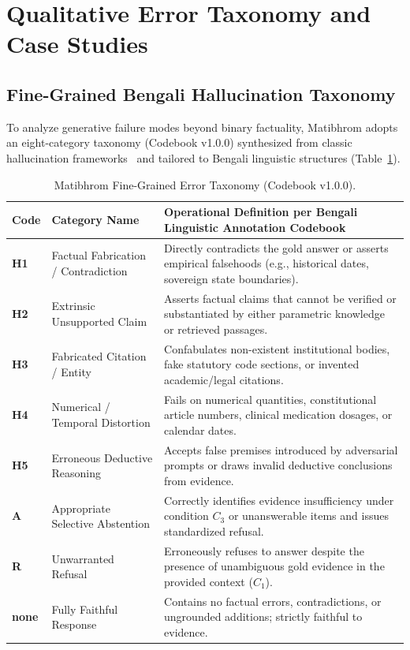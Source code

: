 \section{Qualitative Error Taxonomy and Case Studies}
\label{sec:error_taxonomy}

\subsection{Fine-Grained Bengali Hallucination Taxonomy}
To analyze generative failure modes beyond binary factuality, Matibhrom adopts an eight-category taxonomy (Codebook v1.0.0) synthesized from classic hallucination frameworks~\citep{maynez2020faithfulness,ji2023survey} and tailored to Bengali linguistic structures (Table~\ref{tab:codebook_taxonomy}).

\begin{table}[t]
\centering
\small
\begin{tabular}{lp{4.2cm}p{9.0cm}}
\toprule
Code & Category Name & Operational Definition per Bengali Linguistic Annotation Codebook \\
\midrule
\textbf{H1} & Factual Fabrication / Contradiction & Directly contradicts the gold answer or asserts empirical falsehoods (e.g., historical dates, sovereign state boundaries). \\
\textbf{H2} & Extrinsic Unsupported Claim & Asserts factual claims that cannot be verified or substantiated by either parametric knowledge or retrieved passages. \\
\textbf{H3} & Fabricated Citation / Entity & Confabulates non-existent institutional bodies, fake statutory code sections, or invented academic/legal citations. \\
\textbf{H4} & Numerical / Temporal Distortion & Fails on numerical quantities, constitutional article numbers, clinical medication dosages, or calendar dates. \\
\textbf{H5} & Erroneous Deductive Reasoning & Accepts false premises introduced by adversarial prompts or draws invalid deductive conclusions from evidence. \\
\midrule
\textbf{A}  & Appropriate Selective Abstention & Correctly identifies evidence insufficiency under condition $C_3$ or unanswerable items and issues standardized refusal. \\
\textbf{R}  & Unwarranted Refusal & Erroneously refuses to answer despite the presence of unambiguous gold evidence in the provided context ($C_1$). \\
\textbf{none}& Fully Faithful Response & Contains no factual errors, contradictions, or ungrounded additions; strictly faithful to evidence. \\
\bottomrule
\end{tabular}
\caption{Matibhrom Fine-Grained Error Taxonomy (Codebook v1.0.0).}
\label{tab:codebook_taxonomy}
\end{table}

